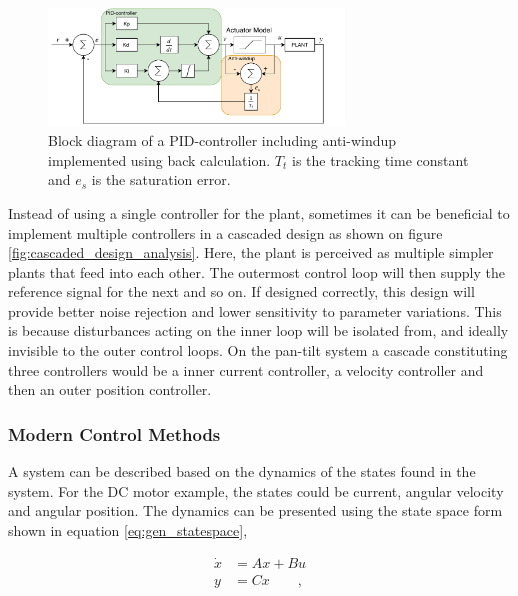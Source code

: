 \documentclass[../../main.tex]{subfiles}
\begin{document}
\begin{figure}
    \centering
    \includegraphics[width=0.7\textwidth]{Sections/Miscellaneous/Images/PID-Anti-windup-BackCalc.pdf}
    \caption{Block diagram of a PID-controller including anti-windup implemented using back calculation. $T_t$ is the tracking time constant and $e_s$ is the saturation error.}
    \label{fig:anti-windup}
\end{figure}

Instead of using a single controller for the plant, sometimes it can be beneficial to implement multiple controllers in a cascaded design as shown on figure \ref{fig:cascaded_design_analysis}. Here, the plant is perceived as multiple simpler plants that feed into each other. The outermost control loop will then supply the reference signal for the next and so on. If designed correctly, this design will provide better noise rejection and lower sensitivity to parameter variations. This is because disturbances acting on the inner loop will be isolated from, and ideally invisible to the outer control loops. On the pan-tilt system a cascade constituting three controllers would be a inner current controller, a velocity controller and then an outer position controller.

\subsubsection*{Modern Control Methods}
A system can be described based on the dynamics of the states found in the system. For the DC motor example, the states could be current, angular velocity and angular position. The dynamics can be presented using the state space form shown in equation \ref{eq:gen_statespace},

\begin{equation}\label{eq:gen_statespace}
    \begin{split}
        \Dot{x}&=Ax+Bu \\
        y&=Cx \qquad ,%
    \end{split}
\end{equation}
\end{document}
